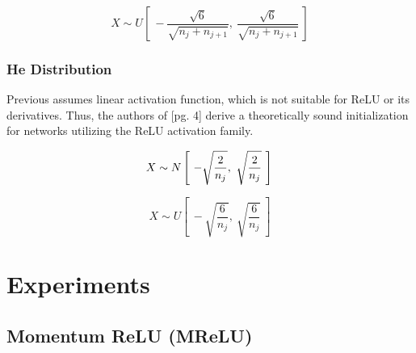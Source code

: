\documentclass[12pt]{article}
\begin{document}
\begin{equation}
    X \sim U \left[~-\frac{\sqrt{6}}{\sqrt{n_{j} + n_{j+1}}},~\frac{\sqrt{6}}{\sqrt{n_{j} + n_{j+1}}}~\right]
    \label{eq:glorot:uniform}
\end{equation}

\subsubsection{He Distribution}

Previous assumes linear activation function, which is not suitable for ReLU or its derivatives. Thus, the authors of \cite{he15}[pg. 4] derive a theoretically sound initialization for networks utilizing the ReLU activation family.

\begin{equation}
    X \sim N \left[~-\sqrt{\frac{2}{n_{j}}},~\sqrt{\frac{2}{n_{j}}}~\right]\\
    \label{eq:he:normal}
\end{equation}

\begin{equation}
    X \sim U \left[~-\sqrt{\frac{6}{n_{j}}},~\sqrt{\frac{6}{n_{j}}}~\right]
    \label{eq:he:uniform}
\end{equation}

\section{Experiments}

\subsection{Momentum ReLU (MReLU)}




\end{document}
